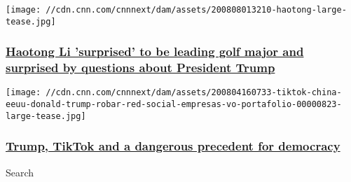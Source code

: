 \href{/2020/08/08/golf/golf-pga-haotong-trump-koepka-woods-spt-intl/index.html}{}

\texttt{[image: //cdn.cnn.com/cnnnext/dam/assets/200808013210-haotong-large-tease.jpg]}

\hypertarget{haotong-li-surprised-to-be-leading-golf-major-and-surprised-by-questions-about-president-trump}{%
\subsubsection{\texorpdfstring{\href{/2020/08/08/golf/golf-pga-haotong-trump-koepka-woods-spt-intl/index.html}{Haotong
Li 'surprised' to be leading golf major and surprised by questions about
President
Trump}}{Haotong Li 'surprised' to be leading golf major and surprised by questions about President Trump}}\label{haotong-li-surprised-to-be-leading-golf-major-and-surprised-by-questions-about-president-trump}}

\href{/2020/08/08/business/trump-tiktok-democracy-intl/index.html}{}

\texttt{[image: //cdn.cnn.com/cnnnext/dam/assets/200804160733-tiktok-china-eeuu-donald-trump-robar-red-social-empresas-vo-portafolio-00000823-large-tease.jpg]}

\hypertarget{trump-tiktok-and-a-dangerous-precedent-for-democracy-}{%
\subsubsection{\texorpdfstring{\href{/2020/08/08/business/trump-tiktok-democracy-intl/index.html}{Trump,
TikTok and a dangerous precedent for democracy
}}{Trump, TikTok and a dangerous precedent for democracy }}\label{trump-tiktok-and-a-dangerous-precedent-for-democracy-}}

Search

